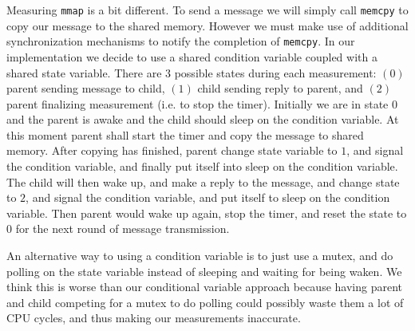 \documentclass[11pt,conference]{IEEEtran}
\begin{document}
Measuring \texttt{mmap} is a bit different.
To send a message we will simply call \texttt{memcpy} to copy our message to the shared memory.
However we must make use of additional synchronization mechanisms to notify the completion of \texttt{memcpy}.
In our implementation we decide to use a shared condition variable coupled with a shared state variable.
There are $3$ possible states during each measurement: $(0)$ parent sending message to child, $(1)$ child sending reply to parent, and $(2)$ parent finalizing measurement (i.e. to stop the timer).
Initially we are in state $0$ and the parent is awake and the child should sleep on the condition variable.
At this moment parent shall start the timer and copy the message to shared memory.
After copying has finished, parent change state variable to $1$, and signal the condition variable, and finally put itself into sleep on the condition variable.
The child will then wake up, and make a reply to the message, and change state to $2$, and signal the condition variable, and put itself to sleep on the condition variable.
Then parent would wake up again, stop the timer, and reset the state to $0$ for the next round of message transmission.

An alternative way to using a condition variable is to just use a mutex, and do polling on the state variable instead of sleeping and waiting for being waken.
We think this is worse than our conditional variable approach because having parent and child competing for a mutex to do polling could possibly waste them a lot of CPU cycles, and thus making our measurements inaccurate.
\end{document}

